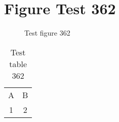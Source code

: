 \documentclass{article}
\begin{document}
\section{Figure Test 362}
\begin{figure}[h]
\caption{Test figure 362}
\end{figure}
\begin{table}[h]
\caption{Test table 362}
\begin{tabular}{cc}
A & B \\
1 & 2
\end{tabular}
\end{table}
\end{document}
